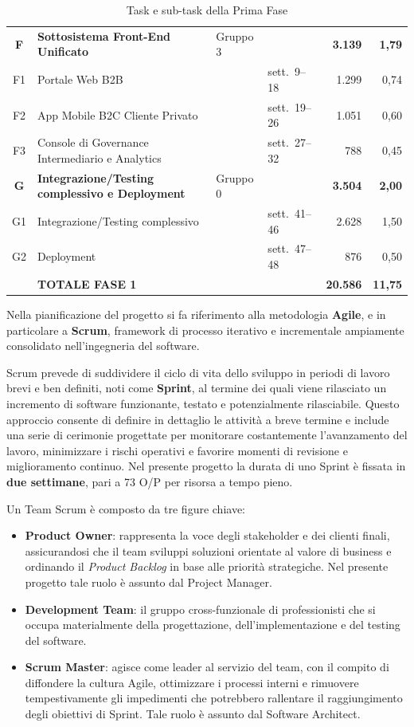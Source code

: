 \begin{table}[H]
{\begin{tabular}{clllrr}
\textbf{F} & \textbf{Sottosistema Front-End Unificato} & Gruppo 3 & & \textbf{3.139} & \textbf{1,79} \\
F1 & Portale Web B2B & & sett.\ 9--18 & 1.299 & 0,74 \\
F2 & App Mobile B2C Cliente Privato & & sett.\ 19--26 & 1.051 & 0,60 \\
F3 & Console di Governance Intermediario e Analytics & & sett.\ 27--32 & 788 & 0,45 \\
\hline
\textbf{G} & \textbf{Integrazione/Testing complessivo e Deployment} & Gruppo 0 & & \textbf{3.504} & \textbf{2,00} \\
G1 & Integrazione/Testing complessivo & & sett.\ 41--46 & 2.628 & 1,50 \\
G2 & Deployment & & sett.\ 47--48 & 876 & 0,50 \\
\hline
& \textbf{TOTALE FASE 1} & & & \textbf{20.586} & \textbf{11,75} \\
\hline
\end{tabular}}
\caption{Task e sub-task della Prima Fase}
\label{tab:task-fase1}
\end{table}

Nella pianificazione del progetto si fa riferimento alla metodologia \textbf{Agile}, e in particolare a \textbf{Scrum}, framework di processo iterativo e incrementale ampiamente consolidato nell'ingegneria del software.

Scrum prevede di suddividere il ciclo di vita dello sviluppo in periodi di lavoro brevi e ben definiti, noti come \textbf{Sprint}, al termine dei quali viene rilasciato un incremento di software funzionante, testato e potenzialmente rilasciabile. Questo approccio consente di definire in dettaglio le attività a breve termine e include una serie di cerimonie progettate per monitorare costantemente l'avanzamento del lavoro, minimizzare i rischi operativi e favorire momenti di revisione e miglioramento continuo. Nel presente progetto la durata di uno Sprint è fissata in \textbf{due settimane}, pari a 73 O/P per risorsa a tempo pieno.

Un Team Scrum è composto da tre figure chiave:

\begin{itemize}
    \item \textbf{Product Owner}: rappresenta la voce degli stakeholder e dei clienti finali, assicurandosi che il team sviluppi soluzioni orientate al valore di business e ordinando il \textit{Product Backlog} in base alle priorità strategiche. Nel presente progetto tale ruolo è assunto dal Project Manager.
    \item \textbf{Development Team}: il gruppo cross-funzionale di professionisti che si occupa materialmente della progettazione, dell'implementazione e del testing del software.
    \item \textbf{Scrum Master}: agisce come leader al servizio del team, con il compito di diffondere la cultura Agile, ottimizzare i processi interni e rimuovere tempestivamente gli impedimenti che potrebbero rallentare il raggiungimento degli obiettivi di Sprint. Tale ruolo è assunto dal Software Architect.
\end{itemize}


